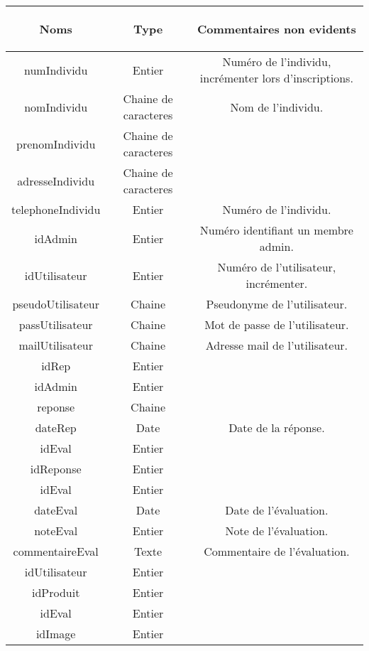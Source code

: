 \begin{tabular}{|c|c|c|}
\hline
	\begin{bf}Noms\end{bf} & 
	\begin{bf}Type \end{bf} & 
	\begin{bf}Commentaires non evidents\end{bf}\\
\hline
	numIndividu & Entier & Numéro de l'individu, incrémenter lors d'inscriptions.\\
\hline
	nomIndividu & Chaine de caracteres & Nom de l'individu.\\
\hline
	prenomIndividu & Chaine de caracteres & \\
\hline
	adresseIndividu & Chaine de caracteres & \\
\hline
	telephoneIndividu & Entier & Numéro de l'individu.\\
\hline
	idAdmin & Entier & Numéro identifiant un membre admin.\\
\hline
	idUtilisateur & Entier & Numéro de l'utilisateur, incrémenter.\\
\hline
	pseudoUtilisateur & Chaine & Pseudonyme de l'utilisateur.\\
\hline
	passUtilisateur & Chaine & Mot de passe de l'utilisateur.\\
\hline
	mailUtilisateur & Chaine & Adresse mail de l'utilisateur.\\
\hline
	idRep & Entier & \\
\hline
	idAdmin & Entier & \\
\hline
	reponse & Chaine & \\
\hline
	dateRep & Date & Date de la réponse.\\
\hline
	idEval & Entier & \\
\hline
	idReponse & Entier & \\
\hline
	idEval & Entier & \\
\hline
	dateEval & Date & Date de l'évaluation.\\
\hline
	noteEval & Entier & Note de l'évaluation.\\
\hline
	commentaireEval & Texte & Commentaire de l'évaluation.\\
\hline
	idUtilisateur & Entier & \\
\hline
	idProduit & Entier & \\
\hline
	idEval & Entier & \\
\hline
	idImage & Entier & \\
\hline

\end{tabular}
